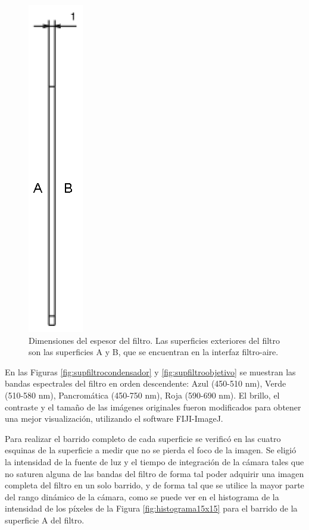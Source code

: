 \begin{figure}[H]
	\centering
	\includegraphics[scale=0.5]{Figs/cuantificaciondefectos/espesorfiltro.png}
	\caption{Dimensiones del espesor del filtro. Las superficies exteriores del filtro son las superficies A y B, que se encuentran en la interfaz filtro-aire.}
	\label{fig:espfil}
\end{figure}

En las Figuras \ref{fig:supfiltrocondensador} y \ref{fig:supfiltroobjetivo} se muestran las bandas espectrales del filtro en orden descendente: Azul (450-510 nm), Verde (510-580 nm), Pancromática (450-750 nm), Roja (590-690 nm). El brillo, el contraste y el tamaño de las imágenes originales fueron modificados para obtener una mejor visualización, utilizando el software FIJI-ImageJ. 

Para realizar el barrido completo de cada superficie se verificó en las cuatro esquinas de la superficie a medir que no se pierda el foco de la imagen. Se eligió la intensidad de la fuente de luz y el tiempo de integración de la cámara tales que no saturen alguna de las bandas del filtro de forma tal poder adquirir una imagen completa del filtro en un solo barrido, y de forma tal que se utilice la mayor parte del rango dinámico de la cámara, como se puede ver en el histograma de la intensidad de los píxeles de la Figura \ref{fig:histograma15x15} para el barrido de la superficie A del filtro.

